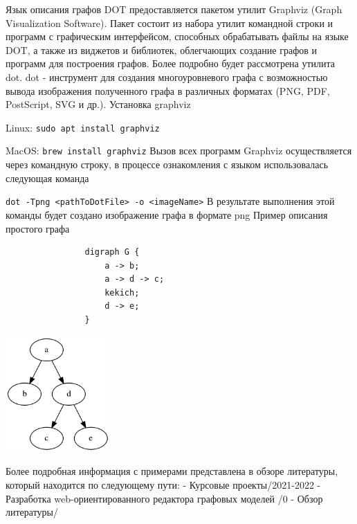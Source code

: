 \def\notedate{2021.11.13}
\def\currentauthor{Муха В. (РК6-73Б)}

Язык описания графов DOT предоставляется пакетом утилит Graphviz (Graph Visualization Software). Пакет состоит из набора утилит командной строки и программ с графическим интерфейсом, способных обрабатывать файлы на языке DOT, а также из виджетов и библиотек, облегчающих создание графов и программ для построения графов. Более подробно будет рассмотрена утилита dot.
\newline\newline
dot - инструмент для создания многоуровневого графа с возможностью вывода изображения полученного графа в различных форматах (PNG, PDF, PostScript, SVG и др.).
\newline\newline
Установка graphviz

\quad Linux: \lstinline$sudo apt install graphviz$

\quad MacOS: \lstinline$brew install graphviz$
\newline\newline
Вызов всех программ Graphviz осуществляется через командную строку, в процессе ознакомления с языком использовалась следующая команда

\quad\lstinline$dot -Tpng <pathToDotFile> -o <imageName>$
\newline
В результате выполнения этой команды будет создано изображение графа в формате png
\newline\newline
Пример описания простого графа\newline\newline
\begin{minipage}{0.2\textwidth}
		\begin{verbatim}
				digraph G {
				    a -> b;
				    a -> d -> c;
					kekich;
				    d -> e;
				}
		\end{verbatim}
	\end{minipage}
	\hfill
	\begin{minipage}{0.75\textwidth}
	 	{\includegraphics[width=0.3\textwidth]{ResearchNotes/images/image4.png}\xspace}
	\end{minipage}
\newline\newline\newline
Более подробная информация с примерами представлена в обзоре литературы, который находится по следующему пути:
 - Курсовые проекты/2021-2022 - Разработка web-ориентированного редактора графовых моделей /0 - Обзор литературы/	

\noteattributes{}
